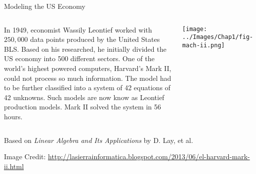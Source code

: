 \documentclass[xcolor=dvipsnames, aspectratio=169]{beamer}
\date{Applications of Linear Systems}
\begin{document}
\begin{frame}{Modeling the US Economy}

  \begin{columns}

    \column{0.7\tw}
    
    \bi
  \ii In 1949, economist Wassily Leontief worked with $250,\!000$ data points produced by the United States BLS.
      \pause
  \ii Based on his researched, he initially divided the US economy into 500 different sectors.
      \pause
  \ii One of the world's highest powered computers, Harvard's Mark II, could not process so much information.
      \pause
  \ii The model had to be further classified into a system of 42 equations of 42 unknowns.
      \pause
  \ii Such models are now know as \alert{Leontief production models}.
      \pause
  \ii Mark II solved the system in 56 hours.
  \ei
  
  \column{0.3\tw}

  \texttt{[image: ../Images/Chap1/fig-mach-ii.png]}

  
  
  \end{columns}

  \vspace{20pt}

  {\footnotesize  Based on \textit{Linear Algebra and Its Applications} by D. Lay, et al.}
  
  
  {\footnotesize  Image Credit: \alert{\href{http://lasierrainformatica.blogspot.com/2013/06/el-harvard-mark-ii.html}{http://lasierrainformatica.blogspot.com/2013/06/el-harvard-mark-ii.html}}}
  
\end{frame}
\end{document}
